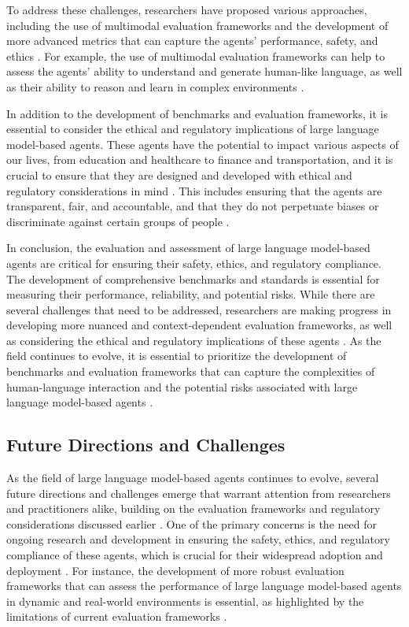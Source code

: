 \documentclass[11pt,a4paper]{article}
\begin{document}
To address these challenges, researchers have proposed various approaches, including the use of multimodal evaluation frameworks \cite{arxiv:2406.04692} and the development of more advanced metrics that can capture the agents' performance, safety, and ethics \cite{arxiv:2405.19616}. For example, the use of multimodal evaluation frameworks can help to assess the agents' ability to understand and generate human-like language, as well as their ability to reason and learn in complex environments \cite{arxiv:2406.04692}.

In addition to the development of benchmarks and evaluation frameworks, it is essential to consider the ethical and regulatory implications of large language model-based agents. These agents have the potential to impact various aspects of our lives, from education and healthcare to finance and transportation, and it is crucial to ensure that they are designed and developed with ethical and regulatory considerations in mind \cite{arxiv:2402.11208}. This includes ensuring that the agents are transparent, fair, and accountable, and that they do not perpetuate biases or discriminate against certain groups of people \cite{doi:10.1007/s11704-024-40231-1}.

In conclusion, the evaluation and assessment of large language model-based agents are critical for ensuring their safety, ethics, and regulatory compliance. The development of comprehensive benchmarks and standards is essential for measuring their performance, reliability, and potential risks. While there are several challenges that need to be addressed, researchers are making progress in developing more nuanced and context-dependent evaluation frameworks, as well as considering the ethical and regulatory implications of these agents \cite{doi:10.1145/3748302}. As the field continues to evolve, it is essential to prioritize the development of benchmarks and evaluation frameworks that can capture the complexities of human-language interaction and the potential risks associated with large language model-based agents \cite{arxiv:2412.14470}.


\subsection{Future Directions and Challenges}


As the field of large language model-based agents continues to evolve, several future directions and challenges emerge that warrant attention from researchers and practitioners alike, building on the evaluation frameworks and regulatory considerations discussed earlier \cite{arxiv:2402.06196}. One of the primary concerns is the need for ongoing research and development in ensuring the safety, ethics, and regulatory compliance of these agents, which is crucial for their widespread adoption and deployment \cite{doi:10.3390/app14052074}. For instance, the development of more robust evaluation frameworks that can assess the performance of large language model-based agents in dynamic and real-world environments is essential, as highlighted by the limitations of current evaluation frameworks \cite{doi:10.1038/s41746-024-01083-y}.
\end{document}
